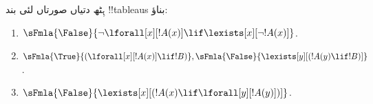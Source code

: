 \documentclass[../../../include/open-logic-section]{subfiles}
\begin{document}
\begin{prob}
ہِٹھ دتیاں صورتاں لئی بند !!{tableau}s بناؤ:
\begin{enumerate}
\item $\sFmla{\False}{\lnot\lforall[x][!A(x)] \lif \lexists[x][\lnot!A(x)]}$.
\item $\sFmla{\True}{(\lforall[x][!A(x)] \lif !B)}, \sFmla{\False}{\lexists[y][(!A(y) \lif !B)]}$.
\item $\sFmla{\False}{\lexists[x][(!A(x) \lif \lforall[y][!A(y)])]}$.
\end{enumerate}
\end{prob}
\end{document}
